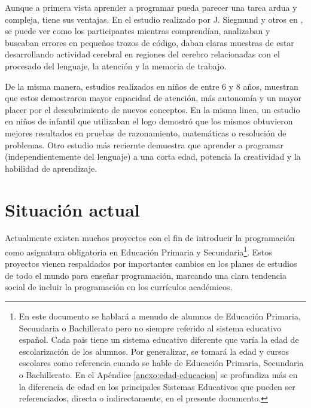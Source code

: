 Aunque a primera vista aprender a programar pueda parecer una tarea ardua y compleja, tiene sus ventajas. En el estudio realizado por J. Siegmund y otros en \cite{siegmund2014understanding}, se puede ver como los participantes mientras comprendían, analizaban y buscaban errores en pequeños trozos de código, daban claras muestras de estar desarrollando actividad cerebral en regiones del cerebro relacionadas con el procesado del lenguaje, la atención y la memoria de trabajo.

De la misma manera, estudios realizados en niños \cite{clements1986effects} de entre 6 y 8 años, muestran que estos demostraron mayor capacidad de atención, más autonomía y un mayor placer por el descubrimiento de nuevos conceptos. En la misma linea, un estudio en niños de infantil \cite{logo-geometry} que utilizaban el \Gls{logo} demostró que los mismos obtuvieron mejores resultados en pruebas de razonamiento, matemáticas o resolución de problemas. Otro estudio más reciernte \cite{liao1991effects} demuestra que aprender a programar (independientemente del lenguaje) a una corta edad, potencia la creatividad y la habilidad de aprendizaje.



\section{Situación actual}
\label{sec:situacion-actual}


Actualmente existen muchos proyectos con el fin de introducir la programación como asignatura obligatoria en Educación Primaria y Secundaria\footnote{En este documento se hablará a menudo de alumnos de Educación Primaria, Secundaria o Bachillerato pero no siempre referido al sistema educativo español. Cada pais tiene un sistema educativo diferente que varía la edad de escolarización de los alumnos. Por generalizar, se tomará la edad y cursos escolares como referencia cuando se hable de Educación Primaria, Secundaria o Bachillerato. En el Apéndice \ref{anexo:edad-educacion} se profundiza más en la diferencia de edad en los principales Sistemas Educativos que pueden ser referenciados, directa o indirectamente, en el presente documento.}. Estos proyectos vienen respaldados por importantes cambios en los planes de estudios de todo el mundo para enseñar programación\cite{cs-education,madrid-programacion,codigo21, guide-england-computing,chicago-cs}, marcando una clara tendencia social de incluir la programación en los currículos académicos.


